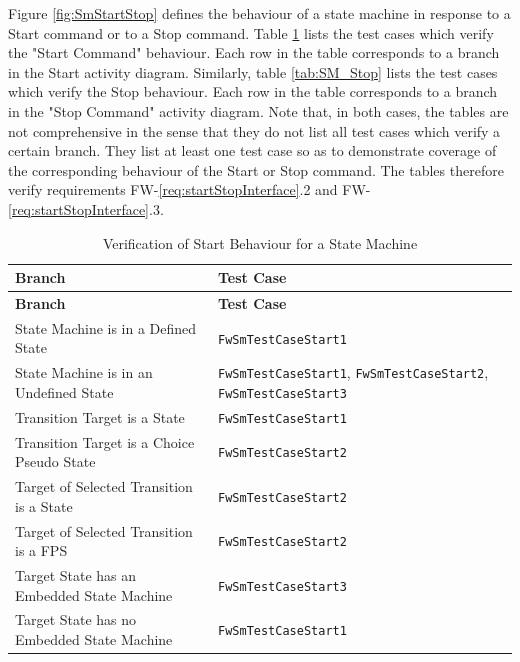 \documentclass[requirements]{../fwprofile}
\begin{document}
\label{Appendix_C_SM_Start_Stop}
Figure \ref{fig:SmStartStop} defines the behaviour of a state machine in response to a 
Start command or to a Stop command. 
Table \ref{tab:SM_Start} lists the test cases which verify the "Start Command" behaviour. 
Each row in the table corresponds to a branch in the Start activity diagram. 
Similarly, table \ref{tab:SM_Stop} lists the test cases which verify the Stop behaviour. 
Each row in the table corresponds to a branch in the "Stop Command" activity diagram. 
Note that, in both cases, the tables are not comprehensive 
in the sense that they do not list all test cases which verify a certain branch. 
They list at least one test case so as to demonstrate coverage 
of the corresponding behaviour of the Start or Stop command.
The tables therefore verify requirements FW-\ref{req:startStopInterface}.2 and
FW-\ref{req:startStopInterface}.3.

\begin{longtable}{|p{7.7cm}|p{3.5cm}|}
\caption{Verification of Start Behaviour for a State Machine} \label{tab:SM_Start}\\
\hline
\rowcolor{gray}
\textbf{Branch} & \textbf{Test Case} \\
\hline
\endfirsthead
\rowcolor{gray}
\textbf{Branch} & \textbf{Test Case} \\
\hline
\endhead
State Machine is in a Defined State & \texttt{FwSmTestCaseStart1} \\
\hline
State Machine is in an Undefined State & \texttt{FwSmTestCaseStart1}, 
\texttt{FwSmTestCaseStart2}, \texttt{FwSmTestCaseStart3} \\
\hline
Transition Target is a State & \texttt{FwSmTestCaseStart1} \\
\hline
Transition Target is a Choice Pseudo State & \texttt{FwSmTestCaseStart2} \\
\hline
Target of Selected Transition is a State & \texttt{FwSmTestCaseStart2} \\
\hline
Target of Selected Transition is a FPS & \texttt{FwSmTestCaseStart2} \\
\hline
Target State has an Embedded State Machine & \texttt{FwSmTestCaseStart3} \\
\hline
Target State has no Embedded State Machine & \texttt{FwSmTestCaseStart1} \\
\hline
\end{longtable}
\end{document}
